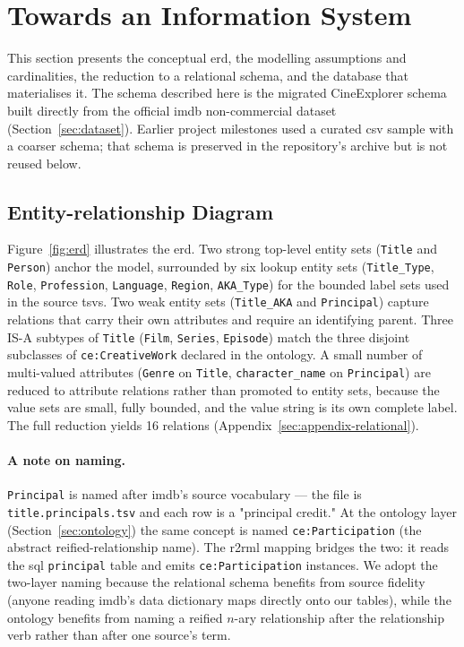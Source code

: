 \section{Towards an Information System}
\label{sec:infosystem}

This section presents the conceptual \ac{erd}, the modelling assumptions and cardinalities, the reduction to a relational schema, and the database that materialises it. The schema described here is the migrated CineExplorer schema built directly from the official \ac{imdb} non-commercial dataset (Section~\ref{sec:dataset}). Earlier project milestones used a curated \ac{csv} sample with a coarser schema; that schema is preserved in the repository's archive but is not reused below.

\subsection{Entity-relationship Diagram}

Figure~\ref{fig:erd} illustrates the \ac{erd}. Two strong top-level entity sets (\texttt{Title} and \texttt{Person}) anchor the model, surrounded by six lookup entity sets (\texttt{Title\_Type}, \texttt{Role}, \texttt{Profession}, \texttt{Language}, \texttt{Region}, \texttt{AKA\_Type}) for the bounded label sets used in the source \acp{tsv}. Two weak entity sets (\texttt{Title\_AKA} and \texttt{Principal}) capture relations that carry their own attributes and require an identifying parent. Three IS-A subtypes of \texttt{Title} (\texttt{Film}, \texttt{Series}, \texttt{Episode}) match the three disjoint subclasses of \texttt{ce:CreativeWork} declared in the ontology. A small number of multi-valued attributes (\texttt{Genre} on \texttt{Title}, \texttt{character\_name} on \texttt{Principal}) are reduced to attribute relations rather than promoted to entity sets, because the value sets are small, fully bounded, and the value string is its own complete label. The full reduction yields 16 relations (Appendix~\ref{sec:appendix-relational}).

\begin{sloppypar}
\paragraph{A note on naming.} \texttt{Principal} is named after \ac{imdb}'s source vocabulary --- the file is \texttt{title.principals.tsv} and each row is a "principal credit." At the ontology layer (Section~\ref{sec:ontology}) the same concept is named \texttt{ce:Participation} (the abstract reified-relationship name). The \ac{r2rml} mapping bridges the two: it reads the \ac{sql} \texttt{principal} table and emits \texttt{ce:Participation} instances. We adopt the two-layer naming because the relational schema benefits from source fidelity (anyone reading \ac{imdb}'s data dictionary maps directly onto our tables), while the ontology benefits from naming a reified $n$-ary relationship after the relationship verb rather than after one source's term.
\end{sloppypar}

